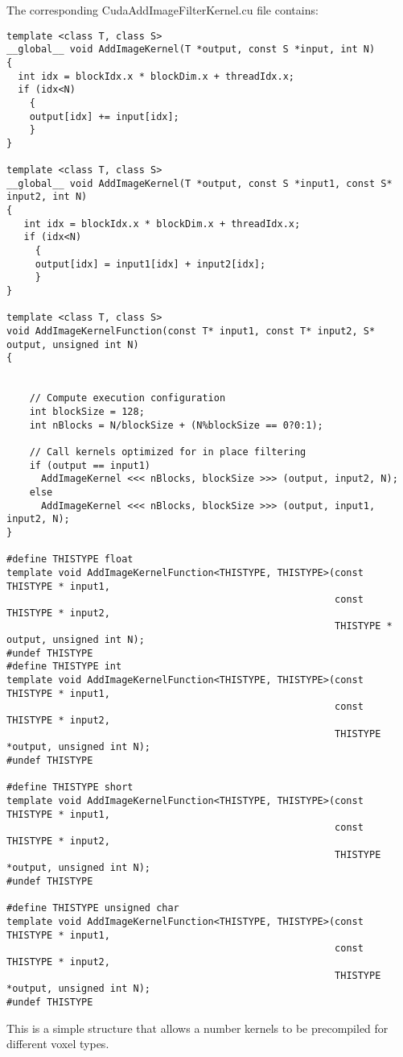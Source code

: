 \documentclass{InsightArticle}
\begin{document}
The corresponding CudaAddImageFilterKernel.cu file contains:
{\small
\begin{verbatim}
template <class T, class S>
__global__ void AddImageKernel(T *output, const S *input, int N)
{
  int idx = blockIdx.x * blockDim.x + threadIdx.x;
  if (idx<N) 
    {
    output[idx] += input[idx];
    }
}

template <class T, class S>
__global__ void AddImageKernel(T *output, const S *input1, const S* input2, int N)
{
   int idx = blockIdx.x * blockDim.x + threadIdx.x;
   if (idx<N) 
     {
     output[idx] = input1[idx] + input2[idx];
     }
}

template <class T, class S>
void AddImageKernelFunction(const T* input1, const T* input2, S* output, unsigned int N)
{


    // Compute execution configuration 
    int blockSize = 128;
    int nBlocks = N/blockSize + (N%blockSize == 0?0:1);

    // Call kernels optimized for in place filtering
    if (output == input1)
      AddImageKernel <<< nBlocks, blockSize >>> (output, input2, N);
    else
      AddImageKernel <<< nBlocks, blockSize >>> (output, input1, input2, N);
}

#define THISTYPE float
template void AddImageKernelFunction<THISTYPE, THISTYPE>(const THISTYPE * input1, 
                                                         const THISTYPE * input2, 
                                                         THISTYPE * output, unsigned int N);
#undef THISTYPE
#define THISTYPE int
template void AddImageKernelFunction<THISTYPE, THISTYPE>(const THISTYPE * input1, 
                                                         const THISTYPE * input2,
                                                         THISTYPE *output, unsigned int N);
#undef THISTYPE

#define THISTYPE short
template void AddImageKernelFunction<THISTYPE, THISTYPE>(const THISTYPE * input1,
                                                         const THISTYPE * input2,
                                                         THISTYPE *output, unsigned int N);
#undef THISTYPE

#define THISTYPE unsigned char
template void AddImageKernelFunction<THISTYPE, THISTYPE>(const THISTYPE * input1, 
                                                         const THISTYPE * input2,
                                                         THISTYPE *output, unsigned int N);
#undef THISTYPE

\end{verbatim}
}
This is a simple structure that allows a number kernels to be precompiled for different voxel types.
\end{document}
